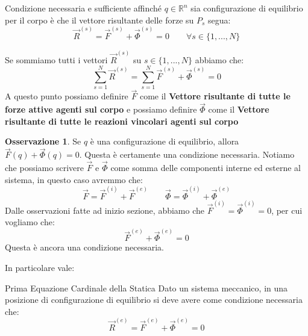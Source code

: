 \documentclass[11pt,a4paper,twoside]{article}
\theoremstyle{definition}
\newtheorem*{oss}{Osservazione}
\begin{document}
\begin{prop}{}{}
	Condizione necessaria e sufficiente affinché $q \in \mathbb R^n$ sia configurazione di equilibrio per il corpo è che il vettore risultante delle forze su $P_s$ segua:
	\[ \vec R^{(s)} = \vec F^{(s)} + \vec \Phi^{(s)} = 0\qquad \forall s \in \{1,...,N\} \]
\end{prop}

Se sommiamo tutti i vettori $\vec R^{(s)}$ su $s \in \{1,...,N\}$ abbiamo che:
\[ \sum_{s=1}^N \vec R^{(s)} = \sum_{s = 1}^N \vec F^{(s)} + \vec \Phi^{(s)} = 0 \]
A questo punto possiamo definire $\vec F$ come il \textbf{Vettore risultante di tutte le forze attive agenti sul corpo} e possiamo definire $\vec \Phi$ come il \textbf{Vettore risultante di tutte le reazioni vincolari agenti sul corpo}

\begin{oss}
	Se $q$ è una configurazione di equilibrio, allora $\vec F(q) + \vec \Phi(q) = 0$. Questa è certamente una condizione necessaria. Notiamo che possiamo scrivere $\vec F$ e $\vec \Phi$ come somma delle componenti interne ed esterne al sistema, in questo caso avremmo che:
	\[ \vec F =\vec F^{(i)} + \vec F^{(e)} \qquad \vec \Phi = \vec \Phi^{(i)} + \vec \Phi^{(e)}\]
	Dalle osservazioni fatte ad inizio sezione, abbiamo che $\vec F^{(i)} = \vec \Phi^{(i)} = 0$, per cui vogliamo che:
	\[ \vec F^{(e)} + \vec \Phi^{(e)} = 0 \]
	Questa è ancora una condizione necessaria.
\end{oss}
In particolare vale:

\begin{thm}{Prima Equazione Cardinale della Statica}{}\label{1ECS}
	Dato un sistema meccanico, in una posizione di configurazione di equilibrio si deve avere come condizione necessaria che:
	\[\vec R^{(e)} = \vec F^{(e)} + \vec \Phi^{(e)} = 0\]
\end{thm}
\end{document}
